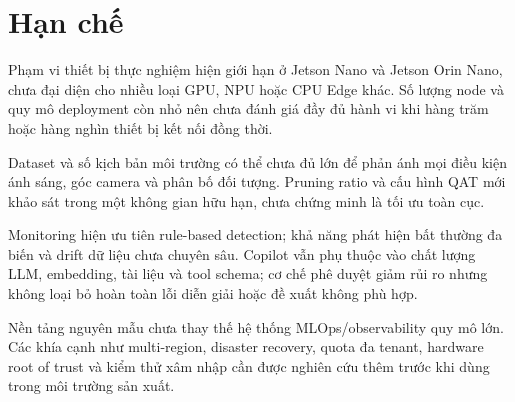 \section{Hạn chế}

Phạm vi thiết bị thực nghiệm hiện giới hạn ở Jetson Nano và Jetson Orin Nano,
chưa đại diện cho nhiều loại GPU, NPU hoặc CPU Edge khác. Số lượng node và quy
mô deployment còn nhỏ nên chưa đánh giá đầy đủ hành vi khi hàng trăm hoặc hàng
nghìn thiết bị kết nối đồng thời.

Dataset và số kịch bản môi trường có thể chưa đủ lớn để phản ánh mọi điều kiện
ánh sáng, góc camera và phân bố đối tượng. Pruning ratio và cấu hình QAT mới khảo
sát trong một không gian hữu hạn, chưa chứng minh là tối ưu toàn cục.

Monitoring hiện ưu tiên rule-based detection; khả năng phát hiện bất thường đa
biến và drift dữ liệu chưa chuyên sâu. Copilot vẫn phụ thuộc vào chất lượng LLM,
embedding, tài liệu và tool schema; cơ chế phê duyệt giảm rủi ro nhưng không loại
bỏ hoàn toàn lỗi diễn giải hoặc đề xuất không phù hợp.

Nền tảng nguyên mẫu chưa thay thế hệ thống MLOps/observability quy mô lớn. Các
khía cạnh như multi-region, disaster recovery, quota đa tenant, hardware root of
trust và kiểm thử xâm nhập cần được nghiên cứu thêm trước khi dùng trong môi
trường sản xuất.